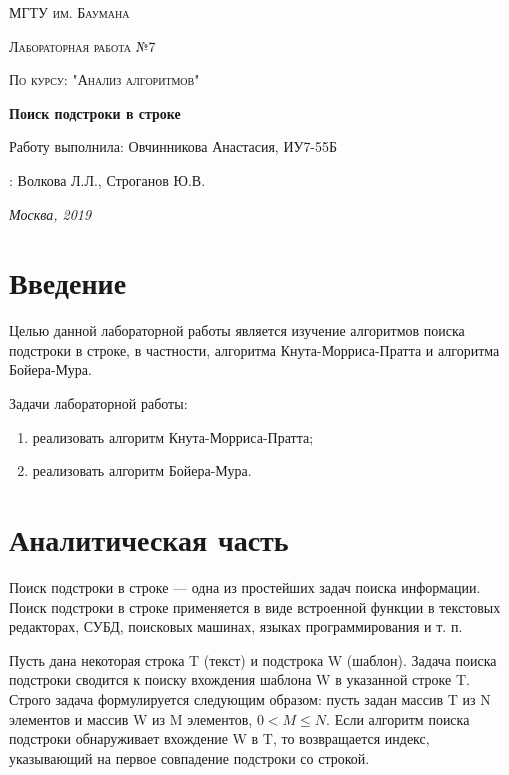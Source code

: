 \documentclass[a4paper,14pt]{report}
\begin{document}
\begin{titlepage}
	\centering
	{\scshape\LARGE МГТУ им. Баумана \par}
	\vspace{3cm}
	{\scshape\Large Лабораторная работа №7\par}
	\vspace{0.5cm}
	{\scshape\Large По курсу: "Анализ алгоритмов"\par}
	\vspace{1.5cm}
	{\huge\bfseries Поиск подстроки в строке\par}
	\vspace{2cm}
	\Large Работу выполнила: Овчинникова Анастасия, ИУ7-55Б\par
	\vspace{0.5cm}
	:  Волкова Л.Л., Строганов Ю.В.\par

	\vfill
	\large \textit {Москва, 2019} \par
\end{titlepage}

\tableofcontents

\newpage
\chapter*{Введение}
Целью данной лабораторной работы является изучение алгоритмов поиска подстроки в строке, в частности, алгоритма Кнута-Морриса-Пратта и алгоритма Бойера-Мура.

Задачи лабораторной работы:

\begin{enumerate}
	\item реализовать алгоритм Кнута-Морриса-Пратта;
	\item реализовать алгоритм Бойера-Мура.
\end{enumerate}


\chapter*{Аналитическая часть}

Поиск подстроки в строке — одна из простейших задач поиска информации. Поиск подстроки в строке применяется в виде встроенной функции в текстовых редакторах, СУБД, поисковых машинах, языках программирования и т. п.

Пусть дана некоторая строка T (текст) и подстрока W (шаблон). Задача поиска подстроки сводится к поиску вхождения шаблона W в указанной строке T. Строго задача формулируется следующим образом: пусть задан массив T из N элементов и массив W из M элементов, $0 < M \leqslant N$. Если алгоритм поиска подстроки обнаруживает вхождение W в T, то возвращается индекс, указывающий на первое совпадение подстроки со строкой.
\end{document}

